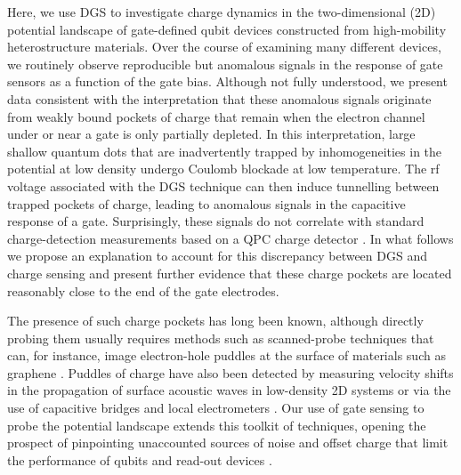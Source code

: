 Here, we use DGS to investigate charge dynamics in the two-dimensional (2D) potential landscape of gate-defined qubit devices constructed from high-mobility heterostructure materials. Over the course of examining many different devices, we routinely observe reproducible but anomalous signals in the response of gate sensors as a function of the gate bias. Although not fully understood, we present data consistent with the interpretation that these anomalous signals originate from weakly bound pockets of charge that remain when the electron channel under or near a gate is only partially depleted. In this interpretation, large shallow quantum dots that are inadvertently trapped by inhomogeneities in the potential at low density \cite{PhysRevB.41.7929} undergo Coulomb blockade at low temperature. The rf voltage associated with the DGS technique can then induce tunnelling between trapped pockets of charge, leading to anomalous signals in the capacitive response of a gate. Surprisingly, these signals do not correlate with standard charge-detection measurements based on a QPC charge detector \cite{PhysRevLett.70.1311}. In what follows we propose an explanation to account for this discrepancy between DGS and charge sensing and present further evidence that these charge pockets are located reasonably close to the end of the gate electrodes.

The presence of such charge pockets has long been known, although directly probing them usually requires methods such as scanned-probe techniques \cite{Finkelstein90} that can, for instance, image electron-hole puddles \cite{PhysRevB.84.115442} at the surface of materials such as graphene \cite{Yacoby_scanned}. Puddles of charge have also been detected by measuring velocity shifts in the propagation of surface acoustic waves in low-density 2D systems \cite{TRACY2006150} or via the use of capacitive bridges \cite{Ashoori_science} and local electrometers \cite{Ilani1354}. Our use of gate sensing to probe the potential landscape extends this toolkit of techniques, opening the prospect of pinpointing unaccounted sources of noise and offset charge that limit the performance of qubits and read-out devices \cite{PhysRevLett.110.146804,Shulman202,nature15263}.


